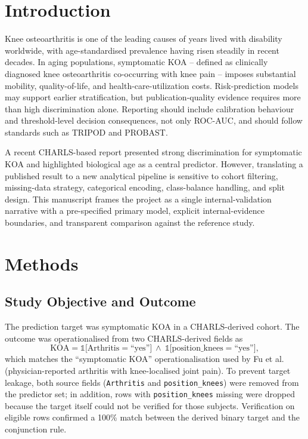 \documentclass[11pt,a4paper]{article}
\begin{document}
\section{Introduction}
Knee osteoarthritis is one of the leading causes of years lived with disability worldwide, with age-standardised prevalence having risen steadily in recent decades\cite{Safiri2020}. In aging populations, symptomatic KOA -- defined as clinically diagnosed knee osteoarthritis co-occurring with knee pain -- imposes substantial mobility, quality-of-life, and health-care-utilization costs. Risk-prediction models may support earlier stratification, but publication-quality evidence requires more than high discrimination alone. Reporting should include calibration behaviour and threshold-level decision consequences, not only ROC-AUC, and should follow standards such as TRIPOD\cite{Collins2015} and PROBAST\cite{Wolff2019}.

A recent CHARLS-based report\cite{Fu2025} presented strong discrimination for symptomatic KOA and highlighted biological age as a central predictor. However, translating a published result to a new analytical pipeline is sensitive to cohort filtering, missing-data strategy, categorical encoding, class-balance handling, and split design. This manuscript frames the project as a single internal-validation narrative with a pre-specified primary model, explicit internal-evidence boundaries, and transparent comparison against the reference study.

\section{Methods}

\subsection{Study Objective and Outcome}
The prediction target was symptomatic KOA in a CHARLS-derived cohort. The outcome was operationalised from two CHARLS-derived fields as
\[
\text{KOA} = \mathbb{1}\bigl[\text{Arthritis} = \text{``yes''}\bigr]\ \wedge\ \mathbb{1}\bigl[\text{position\_knees} = \text{``yes''}\bigr],
\]
\noindent which matches the ``symptomatic KOA'' operationalisation used by Fu et al.\cite{Fu2025} (physician-reported arthritis with knee-localised joint pain). To prevent target leakage, both source fields (\texttt{Arthritis} and \texttt{position\_knees}) were removed from the predictor set; in addition, rows with \texttt{position\_knees} missing were dropped because the target itself could not be verified for those subjects. Verification on eligible rows confirmed a 100\% match between the derived binary target and the conjunction rule.
\end{document}
